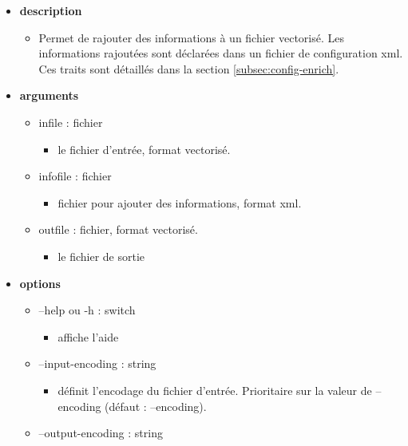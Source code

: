 \documentclass[manual-fr.tex]{subfiles}
\begin{document}
\begin{itemize}
    \item[] \textbf{description}
        \begin{itemize}
            \item[] Permet de rajouter des informations à un fichier vectorisé. Les informations rajoutées sont déclarées dans un fichier de configuration xml. Ces traits sont détaillés dans la section \ref{subsec:config-enrich}.
        \end{itemize}
    \item[] \textbf{arguments}
        \begin{itemize}
            \item[] infile : fichier
                \begin{itemize}
                    \item[] le fichier d'entrée, format vectorisé.
                \end{itemize}
            \item[] infofile : fichier
                \begin{itemize}
                    \item[] fichier pour ajouter des informations, format xml.
                \end{itemize}
            \item[] outfile : fichier, format vectorisé.
                \begin{itemize}
                    \item[] le fichier de sortie
                \end{itemize}
        \end{itemize}
    \item[] \textbf{options}
        \begin{itemize}
            \item[] --help ou -h : switch
                \begin{itemize}
                    \item[] affiche l'aide
                \end{itemize}
            \item[] --input-encoding : string
                \begin{itemize}
                    \item[] définit l'encodage du fichier d'entrée. Prioritaire sur la valeur de --encoding (défaut : --encoding).
                \end{itemize}
            \item[] --output-encoding : string

\end{itemize}
\end{itemize}
\end{document}
